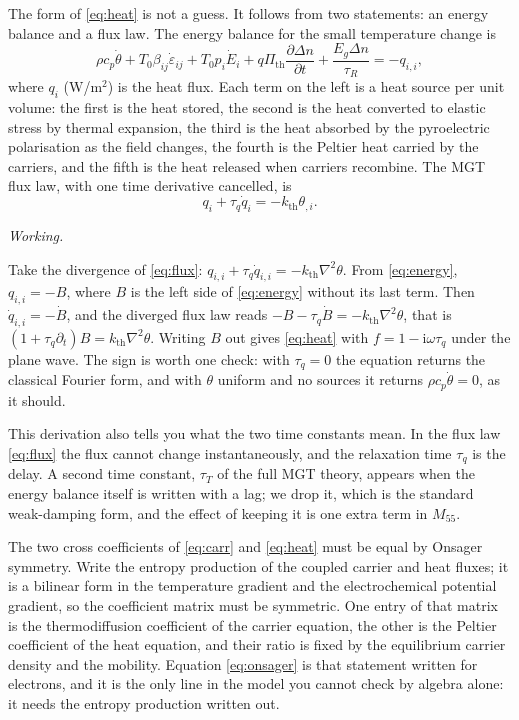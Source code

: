 \documentclass[11pt,a4paper]{article}
\newif\ifshowworked \showworkedtrue
\newenvironment{worked}{\ifshowworked\par\smallskip\noindent\textit{Working.}\par\else\setbox0\vbox\bgroup\fi}{\ifshowworked\par\smallskip\else\egroup\fi}
\newcommand{\eps}{\varepsilon}
\newcommand{\Pth}{\Pi_{\mathrm{th}}}
\newcommand{\ii}{\mathrm{i}}
\newcommand{\kB}{k_{\mathrm{th}}}
\begin{document}
The form of \eqref{eq:heat} is not a guess. It follows from two statements: an energy balance and a flux
law. The energy balance for the small temperature change is
\begin{equation}\label{eq:energy}
\rho c_p\dot\theta+T_0\beta_{ij}\dot\eps_{ij}+T_0p_i\dot E_i
+q\Pth\frac{\partial\Delta n}{\partial t}+\frac{E_g\Delta n}{\tau_R}=-q_{i,i},
\end{equation}
where $q_i$ (W/m$^2$) is the heat flux. Each term on the left is a heat source per unit volume: the first is
the heat stored, the second is the heat converted to elastic stress by thermal expansion, the third is the
heat absorbed by the pyroelectric polarisation as the field changes, the fourth is the Peltier heat carried
by the carriers, and the fifth is the heat released when carriers recombine. The MGT flux law, with one time
derivative cancelled, is
\begin{equation}\label{eq:flux}
q_i+\tau_q\dot q_i=-\kB\theta_{,i}.
\end{equation}

\begin{worked}
Take the divergence of \eqref{eq:flux}: $q_{i,i}+\tau_q\dot q_{i,i}=-\kB\nabla^2\theta$. From
\eqref{eq:energy}, $q_{i,i}=-B$, where $B$ is the left side of \eqref{eq:energy} without its last term. Then
$\dot q_{i,i}=-\dot B$, and the diverged flux law reads $-B-\tau_q\dot B=-\kB\nabla^2\theta$, that is
$(1+\tau_q\partial_t)B=\kB\nabla^2\theta$. Writing $B$ out gives \eqref{eq:heat} with $f=1-\ii\omega\tau_q$
under the plane wave. The sign is worth one check: with $\tau_q=0$ the equation returns the classical
Fourier form, and with $\theta$ uniform and no sources it returns $\rho c_p\dot\theta=0$, as it should.
\end{worked}

\noindent This derivation also tells you what the two time constants mean. In the flux law \eqref{eq:flux}
the flux cannot change instantaneously, and the relaxation time $\tau_q$ is the delay. A second time constant,
$\tau_T$ of the full MGT theory, appears when the energy balance itself is written with a lag; we drop it,
which is the standard weak-damping form, and the effect of keeping it is one extra term in $M_{55}$.

The two cross coefficients of \eqref{eq:carr} and \eqref{eq:heat} must be equal by Onsager symmetry. Write
the entropy production of the coupled carrier and heat fluxes; it is a bilinear form in the temperature
gradient and the electrochemical potential gradient, so the coefficient matrix must be symmetric. One entry
of that matrix is the thermodiffusion coefficient of the carrier equation, the other is the Peltier
coefficient of the heat equation, and their ratio is fixed by the equilibrium carrier density and the
mobility. Equation \eqref{eq:onsager} is that statement written for electrons, and it is the only line
in the model you cannot check by algebra alone: it needs the entropy production written out.
\end{document}
